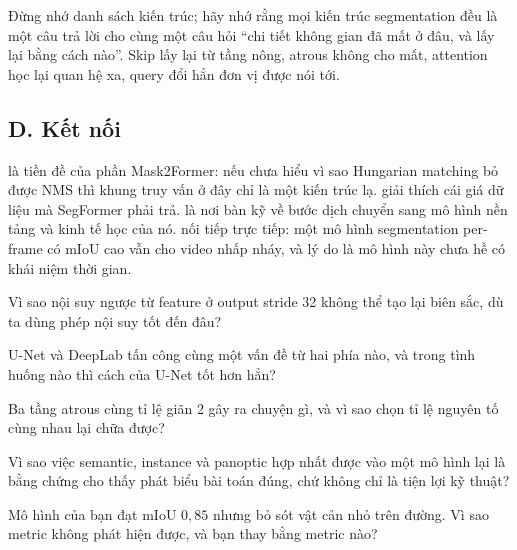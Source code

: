 \documentclass[../../../deep_learning.tex]{subfiles}
\begin{document}
\begin{cannho}
Đừng nhớ danh sách kiến trúc; hãy nhớ rằng mọi kiến trúc segmentation đều là một câu trả lời cho cùng một câu hỏi ``chi tiết không gian đã mất ở đâu, và lấy lại bằng cách nào''. Skip lấy lại từ tầng nông, atrous không cho mất, attention học lại quan hệ xa, query đổi hẳn đơn vị được nói tới. 
\end{cannho}

\subsection{D. Kết nối}
 là tiền đề của phần Mask2Former: nếu chưa hiểu vì sao Hungarian matching bỏ được NMS thì khung truy vấn ở đây chỉ là một kiến trúc lạ.  giải thích cái giá dữ liệu mà SegFormer phải trả.  là nơi bàn kỹ về bước dịch chuyển sang mô hình nền tảng và kinh tế học của nó.  nối tiếp trực tiếp: một mô hình segmentation per-frame có mIoU cao vẫn cho video nhấp nháy, và lý do là mô hình này chưa hề có khái niệm thời gian.

\begin{tukiem}
\item Vì sao nội suy ngược từ feature ở output stride 32 không thể tạo lại biên sắc, dù ta dùng phép nội suy tốt đến đâu?
\item U-Net và DeepLab tấn công cùng một vấn đề từ hai phía nào, và trong tình huống nào thì cách của U-Net tốt hơn hẳn?
\item Ba tầng atrous cùng tỉ lệ giãn 2 gây ra chuyện gì, và vì sao chọn tỉ lệ nguyên tố cùng nhau lại chữa được?
\item Vì sao việc semantic, instance và panoptic hợp nhất được vào một mô hình lại là bằng chứng cho thấy phát biểu bài toán đúng, chứ không chỉ là tiện lợi kỹ thuật?
\item Mô hình của bạn đạt mIoU \(0{,}85\) nhưng bỏ sót vật cản nhỏ trên đường. Vì sao metric không phát hiện được, và bạn thay bằng metric nào?
\end{tukiem}
\ifSubfilesClassLoaded{\printbibliography[title={Nguồn}]}{}
\end{document}
